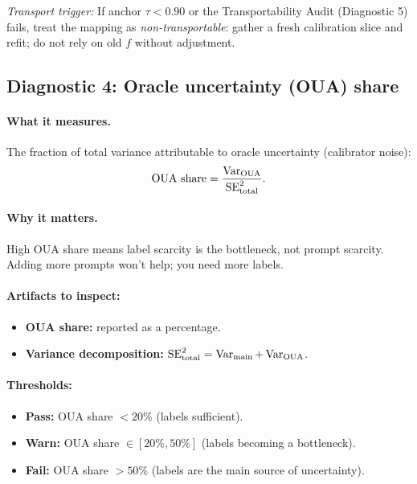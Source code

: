 \begin{enumerate}[resume]
\noindent\emph{Transport trigger:} If anchor $\tau < 0.90$ or the Transportability Audit (Diagnostic 5) fails, treat the mapping as \emph{non-transportable}: gather a fresh calibration slice and refit; do not rely on old $f$ without adjustment.

\subsection{Diagnostic 4: Oracle uncertainty (OUA) share}

\paragraph{What it measures.} The fraction of total variance attributable to oracle uncertainty (calibrator noise):
\begin{equation}
\text{OUA share} = \frac{\operatorname{Var}_{\text{OUA}}}{\operatorname{SE}^2_{\text{total}}}.
\end{equation}

\paragraph{Why it matters.} High OUA share means label scarcity is the bottleneck, not prompt scarcity. Adding more prompts won't help; you need more labels.

\paragraph{Artifacts to inspect:}
\begin{itemize}
\item \textbf{OUA share:} reported as a percentage.
\item \textbf{Variance decomposition:} $\operatorname{SE}^2_{\text{total}} = \operatorname{Var}_{\text{main}} + \operatorname{Var}_{\text{OUA}}$.
\end{itemize}

\paragraph{Thresholds:}
\begin{itemize}
\item \textbf{Pass:} OUA share $< 20\%$ (labels sufficient).
\item \textbf{Warn:} OUA share $\in [20\%, 50\%]$ (labels becoming a bottleneck).
\item \textbf{Fail:} OUA share $> 50\%$ (labels are the main source of uncertainty).
\end{itemize}


\end{enumerate}
